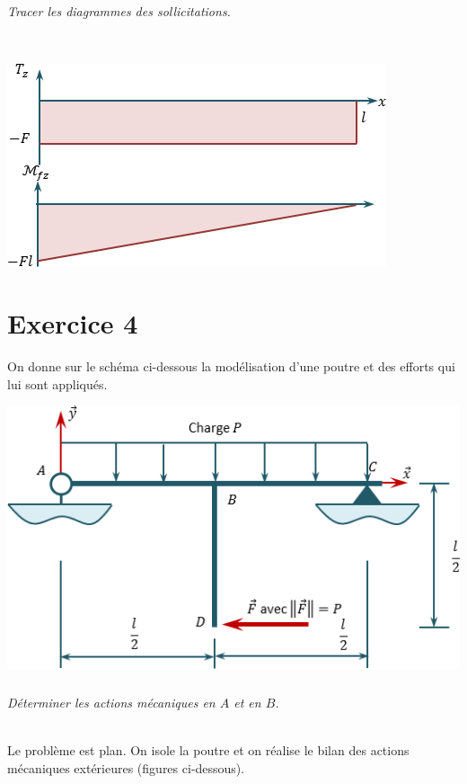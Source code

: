 \documentclass[10pt,fleqn]{article} %
\begin{document}
\begin{multicols}{1}
\begin{corrige}
\end{corrige}
\else
\fi

\subparagraph{}
\textit{Tracer les diagrammes des sollicitations.}
\ifprof
\begin{corrige}~\\

\begin{center}
\includegraphics[width=.6\linewidth]{images/exo_01_01_corr_02}
\end{center}
\end{corrige}
\else
\fi


\section*{Exercice 4}
\setcounter{subparagraph}{0}
On donne sur le schéma ci-dessous la modélisation d'une poutre et des efforts qui lui sont appliqués.
\begin{center}
\includegraphics[width=.45\textwidth]{images/exo_03}
\end{center}

\subparagraph{}
\textit{Déterminer les actions mécaniques en $A$ et en $B$.}
\ifprof
\begin{corrige}~\\

Le problème est plan. On isole la poutre et on réalise le bilan des actions mécaniques extérieures (figures ci-dessous). 


\end{corrige}
\end{multicols}
\end{document}
